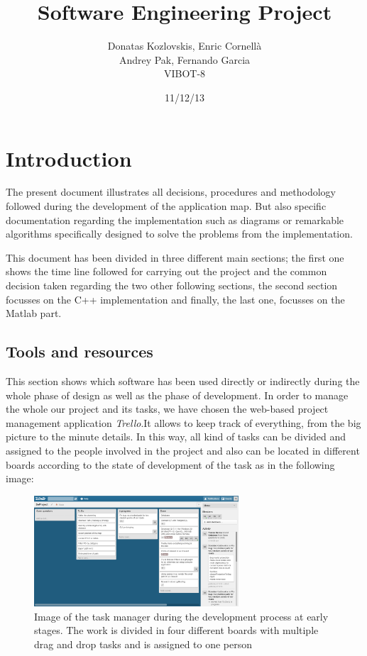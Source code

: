\documentclass{article}
\title{Software Engineering Project}
\author{Donatas Kozlovskis, Enric Cornellà\\
		Andrey Pak,  Fernando Garcia\\
		VIBOT-8}
\date{11/12/13}
\begin{document}
\maketitle

\section{Introduction}

The present document illustrates all decisions, procedures and methodology followed during the development of the application map. But also specific documentation regarding the implementation such as diagrams or remarkable algorithms specifically designed to solve the problems from the implementation.

This document has been divided in three different main sections; the first one shows the time line followed for carrying out the project and the common decision taken regarding the two other following sections, the second section focusses on the C++ implementation and finally, the last one, focusses on the Matlab part. 

\subsection{Tools and resources}
This section shows which software has been used directly or indirectly during the whole phase of design as well as the phase of development.
In order to manage the whole our project and its tasks, we have chosen the web-based project management application \textit{Trello}.It allows to keep track of everything, from the big picture to the minute details. In this way, all kind of tasks can be divided and assigned to the people involved in the project and also can be located in different boards according to the state of development of the task as in the following image:

\begin{figure}[!h]
\centering
\includegraphics[width=0.68\textwidth]{trello.png}
\caption{Image of the task manager during the development process at early stages. The work is divided in four different boards with multiple drag and drop tasks and is assigned to one person}
\end{figure}
\end{document}
